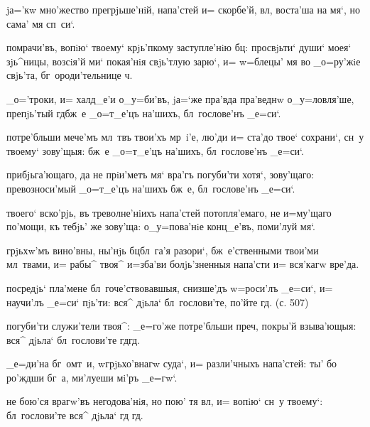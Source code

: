 jа='кw мно'жество прегрjьше'нiй, напа'стей и= скорбе'й, 
вл, воста'ша на мя`, но сама' мя сп~си`.



помрачи'въ, вопiю` твоему` крjь'пкому заступле'нiю бц: 
просвjьти` души` моея` зjь^ницы, возсiя'й ми` покая'нiя 
свjь'тлую зарю`, и= w=блецы' мя во _о=ру'жiе свjь'та, 
бг~ороди'тельнице ч.


_о='троки, и= халд_е'и о_у=би'въ, jа=`же пра'вда 
пра'веднw о_у=ловля'ше, препjь'тый гд бж~е _о=т_е'цъ 
на'шихъ, бл~гослове'нъ _е=си`.

потре'бльши мече'мъ мл~твъ твои'хъ мр~i'е, лю'ди и= 
ста'до твое` сохрани`, сн~у твоему` зову'щыя: бж~е 
_о=т_е'цъ на'шихъ, бл~гослове'нъ _е=си`.

прибjьга'ющаго, да не прiи'метъ мя` вра'гъ погуби'ти 
хотя`, зову'щаго: превозноси'мый _о=т_е'цъ на'шихъ бж~е, 
бл~гослове'нъ _е=си`.

твоего` вско'рjь, въ треволне'нiихъ напа'стей 
потопля'емаго, не и=му'щаго по'мощи, къ тебjь' же 
зову'ща: о_у=пова'нiе конц_е'въ, поми'луй мя`.

грjьхw'мъ вино'вны, ны'нjь бц бл~га'я разори`, 
бж~е'ственными твои'ми мл~твами, и= рабы^ твоя^ и=зба'ви 
болjь'зненныя напа'сти и= вся'кагw вре'да.


посредjь` пла'мене бл~гоче'ствовавшыя, снизше'дъ 
w=роси'лъ _е=си`, и= научи'лъ _е=си` пjь'ти: вся^ дjьла` 
бл~гослови'те, по'йте гд. (с. 507)

погуби'ти служи'тели твоя^: _е=го'же потре'бльши 
преч, покры'й взыва'ющыя: вся^ дjьла` бл~гослови'те 
гд гд.

_е=ди'на бг~омт~и, w\т грjьхо'внагw суда`, и= разли'чныхъ 
напа'стей: ты' бо ро'ждши бг~а, ми'луеши мi'ръ _е=гw`.

не бою'ся врагw'въ негодова'нiя, но пою' тя вл, и= 
вопiю` сн~у твоему`: бл~гослови'те вся^ дjьла` гд 
гд.


